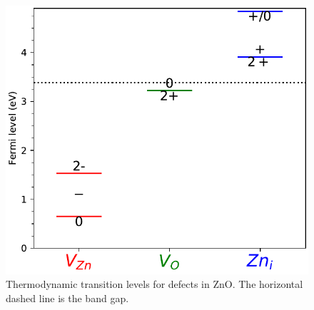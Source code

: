 


\begin{figure}[tbh!]
	\centering
	\includegraphics[width=0.4\linewidth]{"images/rnd/trans_lvl"}
	\caption[Thermodynamic transition levels for defects in ZnO]{Thermodynamic transition levels for defects in ZnO. The horizontal dashed line is the band gap.}
	\label{fig:transition_level}
\end{figure}


